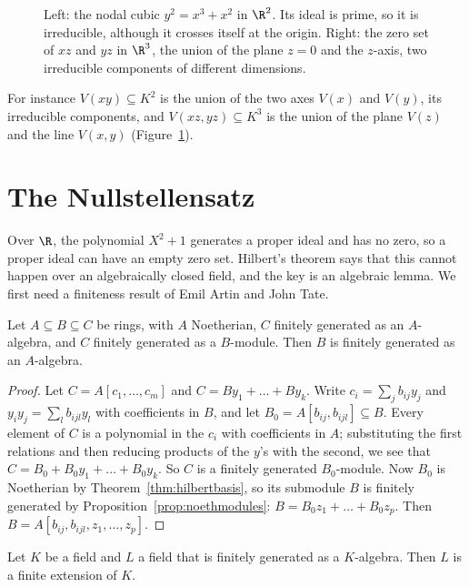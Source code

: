 \begin{figure}[ht]
\centering
{}
\caption{Left: the nodal cubic $y^2=x^3+x^2$ in $\R^2$. Its ideal is prime, so it is irreducible, although it crosses itself at the origin. Right: the zero set of $xz$ and $yz$ in $\R^3$, the union of the plane $z=0$ and
the $z$-axis, two irreducible components of different dimensions.}
\label{fig:varieties}
\end{figure}

For instance $V(xy)\subseteq K^2$ is the union of the two axes $V(x)$ and $V(y)$, its irreducible components, and $V(xz,yz)\subseteq K^3$ is the union of the plane $V(z)$ and the line $V(x,y)$ (Figure~\ref{fig:varieties}).

\section{The Nullstellensatz}

Over $\R$, the polynomial $X^2+1$ generates a proper ideal and has no zero, so a proper ideal can have an empty zero set. Hilbert's theorem says that this cannot happen over an algebraically closed field, and the key
is an algebraic lemma. We first need a finiteness result of Emil Artin and John Tate.

\begin{lemma}\label{lem:artintate}
Let $A\subseteq B\subseteq C$ be rings, with $A$ Noetherian, $C$ finitely generated as an $A$-algebra, and $C$ finitely generated as a $B$-module. Then $B$ is finitely generated as an $A$-algebra.
\end{lemma}

\begin{proof}
Let $C=A[c_1,\dots,c_m]$ and $C=By_1+\dots+By_k$. Write $c_i=\sum_jb_{ij}y_j$ and $y_iy_j=\sum_lb_{ijl}y_l$ with coefficients in $B$, and let $B_0=A[b_{ij},b_{ijl}]\subseteq B$. Every element of $C$ is a polynomial in the $c_i$ with
coefficients in $A$; substituting the first relations and then reducing products of the $y$'s with the second, we see that $C=B_0+B_0y_1+\dots+B_0y_k$. So $C$ is a finitely generated $B_0$-module. Now $B_0$ is Noetherian by
Theorem~\ref{thm:hilbertbasis}, so its submodule $B$ is finitely generated by Proposition~\ref{prop:noethmodules}: $B=B_0z_1+\dots+B_0z_p$. Then $B=A[b_{ij},b_{ijl},z_1,\dots,z_p]$.
\end{proof}

\begin{theorem}\label{thm:zariskilemma}
Let $K$ be a field and $L$ a field that is finitely generated as a $K$-algebra. Then $L$ is a finite extension of $K$.
\end{theorem}

